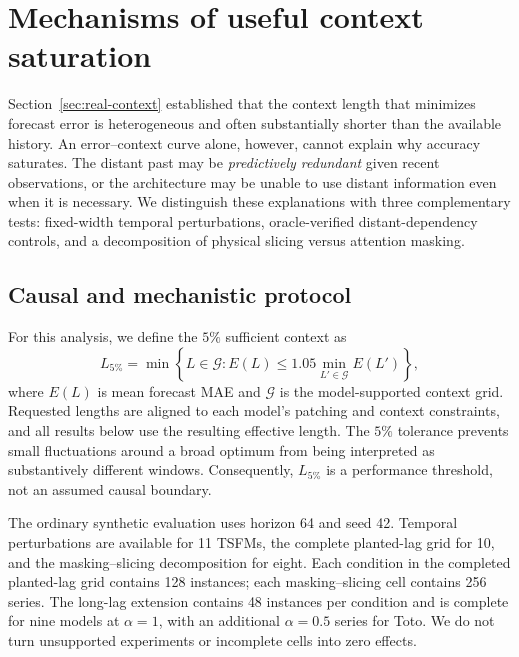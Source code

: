 
\section{Mechanisms of useful context saturation}
\label{sec:context-mechanisms}

Section~\ref{sec:real-context} established that the context length that
minimizes forecast error is heterogeneous and often substantially shorter than
the available history.  An error--context curve alone, however, cannot explain
why accuracy saturates.  The distant past may be \emph{predictively redundant}
given recent observations, or the architecture may be unable to use distant
information even when it is necessary.  We distinguish these explanations with
three complementary tests: fixed-width temporal perturbations, oracle-verified
distant-dependency controls, and a decomposition of physical slicing versus
attention masking.

\subsection{Causal and mechanistic protocol}
\label{sec:mechanistic-protocol}

For this analysis, we define the $5\%$ sufficient context as
\begin{equation}
    L_{5\%}
    = \min\left\{
        L\in\mathcal{G}:
        E(L) \leq 1.05\min_{L'\in\mathcal{G}} E(L')
      \right\},
    \label{eq:sufficient-context}
\end{equation}
where $E(L)$ is mean forecast MAE and $\mathcal{G}$ is the model-supported
context grid.  Requested lengths are aligned to each model's patching and
context constraints, and all results below use the resulting effective length.
The $5\%$ tolerance prevents small fluctuations around a broad optimum from
being interpreted as substantively different windows.  Consequently,
$L_{5\%}$ is a performance threshold, not an assumed causal boundary.

The ordinary synthetic evaluation uses horizon 64 and seed 42.  Temporal
perturbations are available for 11 TSFMs, the complete planted-lag grid for 10,
and the masking--slicing decomposition for eight.  Each condition in the
completed planted-lag grid contains 128 instances; each masking--slicing cell
contains 256 series.  The long-lag extension contains 48 instances per
condition and is complete for nine models at $\alpha=1$, with an additional
$\alpha=0.5$ series for Toto.  We do not turn unsupported experiments or
incomplete cells into zero effects.

